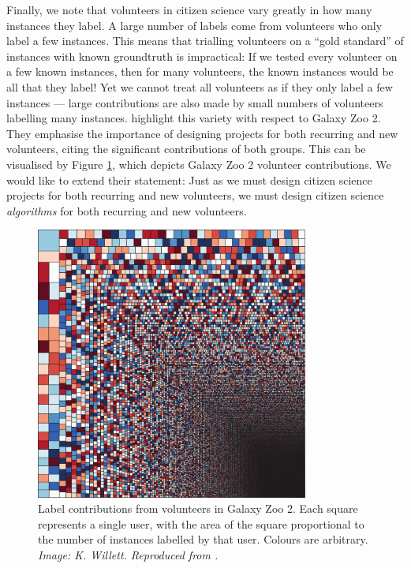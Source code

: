     Finally, we note that volunteers in citizen science vary greatly in how many
    instances they label. A large number of labels come from volunteers who only
    label a few instances. This means that trialling volunteers on a ``gold
    standard'' of instances with known groundtruth is impractical: If we tested
    every volunteer on a few known instances, then for many volunteers, the
    known instances would be all that they label! Yet we cannot treat all
    volunteers as if they only label a few instances --- large contributions are
    also made by small numbers of volunteers labelling many instances.
    \citet{marshall15} highlight this variety with respect to Galaxy Zoo 2. They
    emphasise the importance of designing projects for both recurring and new
    volunteers, citing the significant contributions of both groups. This can be
    visualised by Figure \ref{fig:galaxy-zoo-2-volunteer-distribution}, which
    depicts Galaxy Zoo 2 volunteer contributions. We would like to extend their
    statement: Just as we must design citizen science projects for both
    recurring and new volunteers, we must design citizen science
    \emph{algorithms} for both recurring and new volunteers.

    \begin{figure}
        \centering
        \includegraphics[width=0.8\textwidth]{images/galaxyzoovolunteers}
        \caption{Label contributions from volunteers in Galaxy Zoo 2. Each
            square represents a single user, with the area of the square
            proportional to the number of instances labelled by that user.
            Colours are arbitrary.
            \emph{Image: K. Willett. Reproduced from \citet{marshall15}.}}
        \label{fig:galaxy-zoo-2-volunteer-distribution}
    \end{figure}
